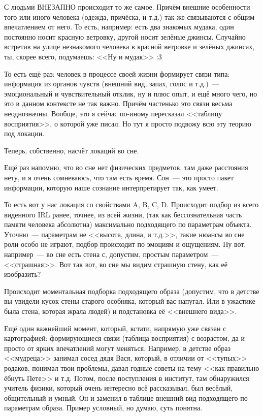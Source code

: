 \documentclass[a5paper,12pt,twoside]{memoir}
\begin{document}
С людьми ВНЕЗАПНО происходит то же самое. Причём внешние особенности того или иного человека (одежда, причёска, и т.д.) так же связываются с общим впечатлением от него. То есть, например: есть два знакомых мудака, один постоянно носит красную ветровку, другой носит зелёные джинсы. Случайно встретив на улице незнакомого человека в красной ветровке и зелёных джинсах, ты, скорее всего, подумаешь: <<Ну и мудак>> :3 

То есть ещё раз: человек в процессе своей жизни формирует связи типа: информация из органов чувств (внешний вид, запах, голос и т.д.)~--- эмоциональный и чувствительный отклик, ну и плюс опыт, и ещё много чего, но это в данном контексте не так важно. Причём частенько это связи весьма неоднозначны. Вообще, это я сейчас по-иному пересказал <<таблицу восприятия>>, о которой уже писал. Но тут я просто подвожу всю эту теорию под локации.

Теперь, собственно, насчёт локаций во сне.

Ещё раз напомню, что во сне нет физических предметов, там даже расстояния нету, и я очень сомневаюсь, что там есть время. Сон~--- это просто пакет информации, которую наше сознание интерпретирует так, как умеет. 

То есть вот у нас локация со свойствами A, B, C, D. Происходит подбор из всего виденного IRL ранее, точнее, из всей жизни, (так как бессознательная часть памяти человека абсолютна) максимально подходящего по параметрам объекта. Уточню~--- параметрам не <<высота, длина, и т.д.>>, такие нюансы во сне роли особо не играют, подбор происходит по эмоциям и ощущениям. Ну вот, например~--- во сне есть стена с, допустим, простым параметром~--- <<страшная>>. Вот так вот, во сне мы видим страшную стену, как её изобразить?
 
Происходит моментальная подборка подходящего образа (допустим, что в детстве вы увидели кусок стены старого особняка, который вас напугал. Или в ужастике была стена, которая жрала людей) и подстановка её <<внешнего вида>>.
 
Ещё один важнейший момент, который, кстати, напрямую уже связан с картографией: формирующиеся связи (таблица восприятия) с возрастом, да и просто от ярких впечатлений могут меняться. Например, в детстве образ <<мудреца>> занимал сосед дядя Вася, который, в отличии от <<тупых>> родаков, понимал твои проблемы, давал годные советы на тему <<как правильно ёбнуть Пете>> и т.д. Потом, после поступления в институт, там обнаружился учитель физики, который очень интересно всё рассказывал, был весёлый, общительный и умный. Он и заменил в таблице внешний вид подходящего по параметрам образа. Пример условный, но думаю, суть понятна.
 
\end{document}

